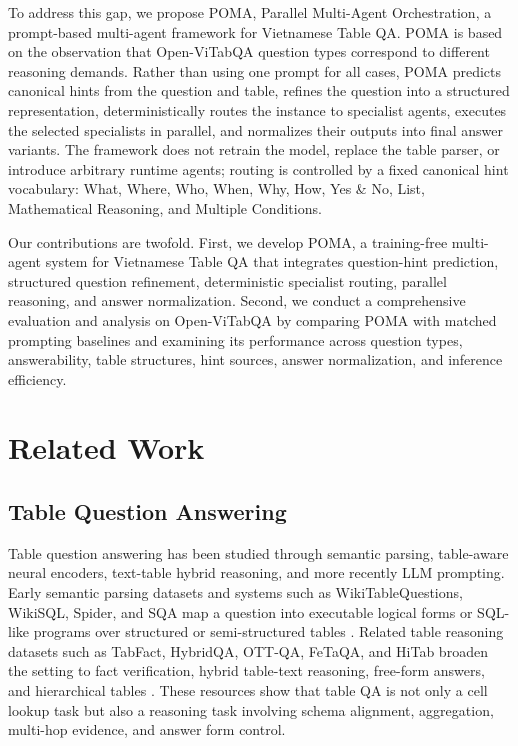 \documentclass[]{interact}
\begin{document}
To address this gap, we propose POMA, Parallel Multi-Agent Orchestration, a prompt-based multi-agent framework for Vietnamese Table QA. POMA is based on the observation that Open-ViTabQA question types correspond to different reasoning demands. Rather than using one prompt for all cases, POMA predicts canonical hints from the question and table, refines the question into a structured representation, deterministically routes the instance to specialist agents, executes the selected specialists in parallel, and normalizes their outputs into final answer variants. The framework does not retrain the model, replace the table parser, or introduce arbitrary runtime agents; routing is controlled by a fixed canonical hint vocabulary: What, Where, Who, When, Why, How, Yes \& No, List, Mathematical Reasoning, and Multiple Conditions.

Our contributions are twofold. First, we develop POMA, a training-free multi-agent system for Vietnamese Table QA that integrates question-hint prediction, structured question refinement, deterministic specialist routing, parallel reasoning, and answer normalization. Second, we conduct a comprehensive evaluation and analysis on Open-ViTabQA by comparing POMA with matched prompting baselines and examining its performance across question types, answerability, table structures, hint sources, answer normalization, and inference efficiency.

\section{Related Work}\label{sec:related}

\subsection{Table Question Answering}

Table question answering has been studied through semantic parsing, table-aware neural encoders, text-table hybrid reasoning, and more recently LLM prompting. Early semantic parsing datasets and systems such as WikiTableQuestions, WikiSQL, Spider, and SQA map a question into executable logical forms or SQL-like programs over structured or semi-structured tables \citep{pasupat-liang-2015-compositional,zhong-etal-2017-seq2sql,yu-etal-2018-spider,iyyer-etal-2017-search}. Related table reasoning datasets such as TabFact, HybridQA, OTT-QA, FeTaQA, and HiTab broaden the setting to fact verification, hybrid table-text reasoning, free-form answers, and hierarchical tables \citep{chen-etal-2020-tabfact,chen-etal-2020-hybridqa,chen-etal-2021-ottqa,nan-etal-2022-fetaqa,cheng-etal-2022-hitab}. These resources show that table QA is not only a cell lookup task but also a reasoning task involving schema alignment, aggregation, multi-hop evidence, and answer form control.
\end{document}
